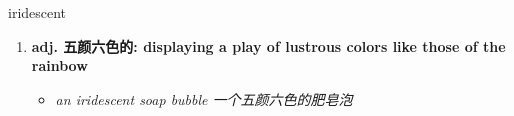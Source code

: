 
\begin{frame}
{\huge iridescent}
\begin{center}
\begin{enumerate}\Large
  \item \textbf{adj. 五颜六色的: displaying a play of lustrous colors like those of the rainbow}
  \begin{itemize}
    \item \em{\Large{an iridescent soap bubble 一个五颜六色的肥皂泡}}
  \end{itemize}
\end{enumerate}
\end{center}
\end{frame}
